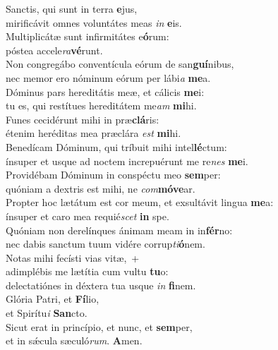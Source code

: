 \evenverse Sanctis, qui sunt in terra \textbf{e}jus,~\*\\
\evenverse mirificávit omnes voluntátes meas \textit{in} \textbf{e}is.\\
\oddverse Multiplicátæ sunt infirmitátes e\textbf{ó}rum:~\*\\
\oddverse póstea accele\textit{ra}\textbf{vé}runt.\\
\evenverse Non congregábo conventícula eórum de san\textbf{guí}nibus,~\*\\
\evenverse nec memor ero nóminum eórum per lábi\textit{a} \textbf{me}a.\\
\oddverse Dóminus pars hereditátis meæ, et cálicis \textbf{me}i:~\*\\
\oddverse tu es, qui restítues hereditátem me\textit{am} \textbf{mi}hi.\\
\evenverse Funes cecidérunt mihi in præ\textbf{clá}ris:~\*\\
\evenverse étenim heréditas mea præclára \textit{est} \textbf{mi}hi.\\
\oddverse Benedícam Dóminum, qui tríbuit mihi intel\textbf{lé}ctum:~\*\\
\oddverse ínsuper et usque ad noctem increpuérunt me re\textit{nes} \textbf{me}i.\\
\evenverse Providébam Dóminum in conspéctu meo \textbf{sem}per:~\*\\
\evenverse quóniam a dextris est mihi, ne \textit{com}\textbf{mó}\textbf{ve}ar.\\
\oddverse Propter hoc lætátum est cor meum, et exsultávit lingua \textbf{me}a:~\*\\
\oddverse ínsuper et caro mea requié\textit{scet} \textbf{in} spe.\\
\evenverse Quóniam non derelínques ánimam meam in in\textbf{fér}no:~\*\\
\evenverse nec dabis sanctum tuum vidére corrup\textit{ti}\textbf{ó}nem.\\
\oddverse Notas mihi fecísti vias vitæ,~+\\
\oddverse  adimplébis me lætítia cum vultu \textbf{tu}o:~\*\\
\oddverse delectatiónes in déxtera tua usque \textit{in} \textbf{fi}nem.\\
\evenverse Glória Patri, et \textbf{Fí}lio,~\*\\
\evenverse et Spirítu\textit{i} \textbf{San}cto.\\
\oddverse Sicut erat in princípio, et nunc, et \textbf{sem}per,~\*\\
\oddverse et in sǽcula sæculó\textit{rum}. \textbf{A}men.\\
